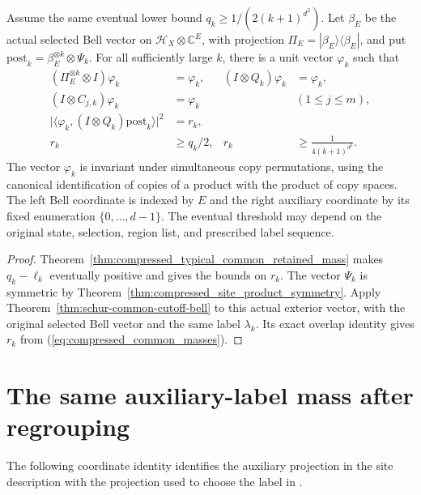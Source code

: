 \begin{theorem}
\label{thm:compressed_typical_common_bell_vector}
\leanok
{}
Assume the same eventual lower bound
$q_k\ge 1/(2(k+1)^{d^2})$. Let $\beta_E$ be the actual selected Bell vector
on $\mathcal H_X\otimes\mathbb C^E$, with projection
$\Pi_E=|\beta_E\rangle\langle\beta_E|$, and put
$\mathrm{post}_k=\beta_E^{\otimes k}\otimes\Psi_k$.
For all sufficiently large $k$, there is a unit vector $\varphi_k$ such that
\begin{align}
 (\Pi_E^{\otimes k}\otimes I)\varphi_k&=\varphi_k,
 &(I\otimes Q_k)\varphi_k&=\varphi_k,\\
 (I\otimes C_{j,k})\varphi_k&=\varphi_k &&(1\le j\le m),\\
 \bigl|\langle\varphi_k,(I\otimes Q_k)\mathrm{post}_k\rangle\bigr|^2
 &=r_k,\\
 r_k&\ge q_k/2,
 &r_k&\ge\frac{1}{4(k+1)^{d^2}}.
\end{align}
The vector $\varphi_k$ is invariant under simultaneous copy permutations,
using the canonical identification of copies of a product with the product
of copy spaces. The left Bell coordinate is indexed by $E$ and the right
auxiliary coordinate by its fixed enumeration $\{0,\ldots,d-1\}$.
The eventual threshold may depend on the original state, selection,
region list, and prescribed label sequence.
\end{theorem}
\begin{proof}\leanok
Theorem~\ref{thm:compressed_typical_common_retained_mass} makes
$q_k-\ell_k$ eventually positive and gives the bounds on $r_k$.
The vector $\Psi_k$ is symmetric by
Theorem~\ref{thm:compressed_site_product_symmetry}. Apply
Theorem~\ref{thm:schur-common-cutoff-bell} to this actual exterior vector,
with the original selected Bell vector and the same label $\lambda_k$.
Its exact overlap identity gives $r_k$ from
(\ref{eq:compressed_common_masses}).
\end{proof}

\section{The same auxiliary-label mass after regrouping}
\label{sec:compressed_typical_label_mass}

The following coordinate identity identifies the auxiliary projection in
the site description with the projection used to choose the label in
\cite[Section~7]{OpenAI2026AreaLaw}.



